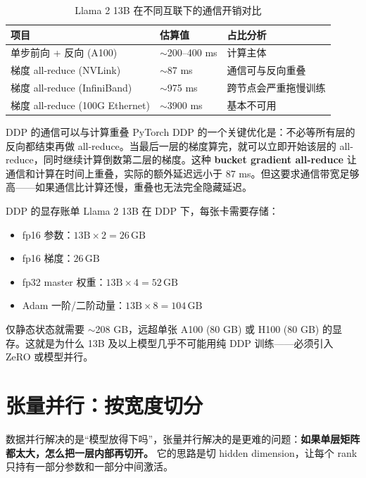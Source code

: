 \documentclass[a4paper]{article}
\begin{document}
\begin{table}[H]
\centering
\small
\begin{tabular}{p{4.5cm}p{3cm}p{4.5cm}}
\toprule
\textbf{项目} & \textbf{估算值} & \textbf{占比分析} \\
\midrule
单步前向 + 反向 (A100) & $\sim$200--400 ms & 计算主体 \\
梯度 all-reduce (NVLink) & $\sim$87 ms & 通信可与反向重叠 \\
梯度 all-reduce (InfiniBand) & $\sim$975 ms & 跨节点会严重拖慢训练 \\
梯度 all-reduce (100G Ethernet) & $\sim$3900 ms & 基本不可用 \\
\bottomrule
\end{tabular}
\caption{Llama 2 13B 在不同互联下的通信开销对比}
\end{table}

\begin{importantbox}{DDP 的通信可以与计算重叠}
PyTorch DDP 的一个关键优化是：不必等所有层的反向都结束再做 all-reduce。当最后一层的梯度算完，就可以立即开始该层的 all-reduce，同时继续计算倒数第二层的梯度。这种 \textbf{bucket gradient all-reduce} 让通信和计算在时间上重叠，实际的额外延迟远小于 87 ms。但这要求通信带宽足够高——如果通信比计算还慢，重叠也无法完全隐藏延迟。
\end{importantbox}

\begin{knowledgebox}{DDP 的显存账单}
Llama 2 13B 在 DDP 下，每张卡需要存储：
\begin{itemize}
    \item fp16 参数：$13\text{B} \times 2 = 26\,\text{GB}$
    \item fp16 梯度：$26\,\text{GB}$
    \item fp32 master 权重：$13\text{B} \times 4 = 52\,\text{GB}$
    \item Adam 一阶/二阶动量：$13\text{B} \times 8 = 104\,\text{GB}$
\end{itemize}
仅静态状态就需要 $\sim$208 GB，远超单张 A100 (80 GB) 或 H100 (80 GB) 的显存。这就是为什么 13B 及以上模型几乎不可能用纯 DDP 训练——必须引入 ZeRO 或模型并行。
\end{knowledgebox}

\section{张量并行：按宽度切分}

数据并行解决的是“模型放得下吗”，张量并行解决的是更难的问题：\textbf{如果单层矩阵都太大，怎么把一层内部再切开。} 它的思路是切 hidden dimension，让每个 rank 只持有一部分参数和一部分中间激活。
\end{document}
